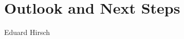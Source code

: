 \chapter{Outlook and Next Steps}
\label{ch:Outlook}

\vspace{-1cm}
\begin{center}
Eduard Hirsch
\end{center}











